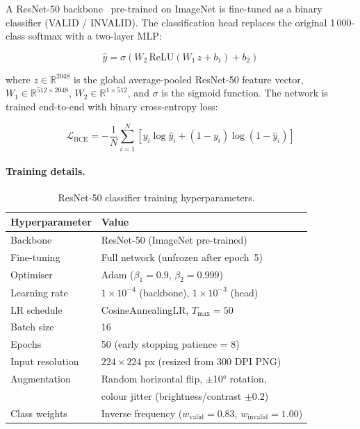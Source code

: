 A ResNet-50 backbone~\cite{he2016resnet} pre-trained on ImageNet is fine-tuned as a
binary classifier (VALID / INVALID). The classification head replaces the original
1\,000-class softmax with a two-layer MLP:

\begin{equation}
\hat{y} = \sigma\!\left(W_2\,\text{ReLU}(W_1\,z + b_1) + b_2\right)
\label{eq:cls_head}
\end{equation}

where $z \in \mathbb{R}^{2048}$ is the global average-pooled ResNet-50 feature vector,
$W_1 \in \mathbb{R}^{512 \times 2048}$, $W_2 \in \mathbb{R}^{1 \times 512}$, and
$\sigma$ is the sigmoid function. The network is trained end-to-end with binary
cross-entropy loss:

\begin{equation}
\mathcal{L}_\text{BCE} = -\frac{1}{N}\sum_{i=1}^{N}
  \left[y_i \log \hat{y}_i + (1-y_i)\log(1-\hat{y}_i)\right]
\label{eq:bce}
\end{equation}

\paragraph{Training details.}

\begin{table}[h]
\centering
\caption{ResNet-50 classifier training hyperparameters.}
\label{tab:resnet_hparams}
\begin{tabular}{ll}
\toprule
\textbf{Hyperparameter} & \textbf{Value} \\
\midrule
Backbone         & ResNet-50 (ImageNet pre-trained) \\
Fine-tuning      & Full network (unfrozen after epoch~5) \\
Optimiser        & Adam ($\beta_1 = 0.9$, $\beta_2 = 0.999$) \\
Learning rate    & $1\times10^{-4}$ (backbone), $1\times10^{-3}$ (head) \\
LR schedule      & CosineAnnealingLR, $T_\text{max} = 50$ \\
Batch size       & 16 \\
Epochs           & 50 (early stopping patience = 8) \\
Input resolution & $224 \times 224$ px (resized from 300 DPI PNG) \\
Augmentation     & Random horizontal flip, $\pm$10° rotation,\\
                 & colour jitter (brightness/contrast $\pm$0.2) \\
Class weights    & Inverse frequency ($w_\text{valid}=0.83$, $w_\text{invalid}=1.00$) \\
\bottomrule
\end{tabular}
\end{table}

